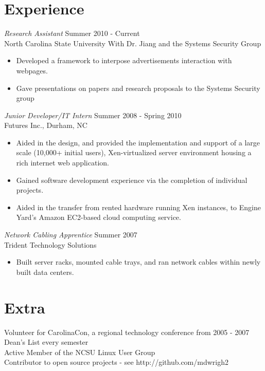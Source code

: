 \documentclass[margin]{res}
\begin{document}
\begin{resume}
\section{\sc Experience} 
    {\sl Research Assistant} \hfill Summer 2010 - Current \\
    North Carolina State University
    With Dr. Jiang and the Systems Security Group
    \begin{itemize} \itemsep -2pt %
      \item Developed a framework to interpose advertisements interaction with webpages.
      \item Gave presentations on papers and research proposals to the Systems Security group
    \end{itemize}
    {\sl Junior Developer/IT Intern} \hfill Summer 2008 - Spring 2010 \\
		Futures Inc., Durham, NC
    \begin{itemize}  \itemsep -2pt %
        \item Aided in the design, and provided the implementation and support of a large scale (10,000+ initial users), Xen-virtualized server environment housing a rich internet web application.
	      \item Gained software development experience via the completion of individual projects.
        \item Aided in the transfer from rented hardware running Xen instances, to
              Engine Yard's Amazon EC2-based cloud computing service.
    \end{itemize}
    {\sl Network Cabling Apprentice} \hfill            Summer 2007 \\
    Trident Technology Solutions
    \begin{itemize}  \itemsep -2pt %
      \item Built server racks, mounted cable trays, and ran network cables within newly built data centers.
    \end{itemize} 
 
\section{\sc Extra}
  Volunteer for CarolinaCon, a regional technology conference from 2005 - 2007\\
  Dean's List every semester\\
  Active Member of the NCSU Linux User Group\\
  Contributor to open source projects - see http://github.com/mdwrigh2

 

\end{resume}
\end{document}
